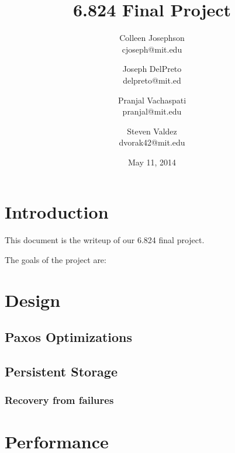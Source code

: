 \documentclass[letterpaper,10pt]{article}
\begin{document}
\title{\Large \bf 6.824 Final Project}
\author{
{\rm Colleen Josephson}\\
cjoseph@mit.edu
\and
{\rm Joseph DelPreto}\\
delpreto@mit.ed
\and
{\rm Pranjal Vachaspati}\\
pranjal@mit.edu
\and
{\rm Steven Valdez}\\
dvorak42@mit.edu
} %

\date{May 11, 2014}

\maketitle


\section{Introduction}
This document is the writeup of our 6.824 final project.

The goals of the project are:

\section{Design} \label{sec:design}

\subsection{Paxos Optimizations}

\subsection{Persistent Storage}

\subsubsection{Recovery from failures}

\section{Performance}
\end{document}
